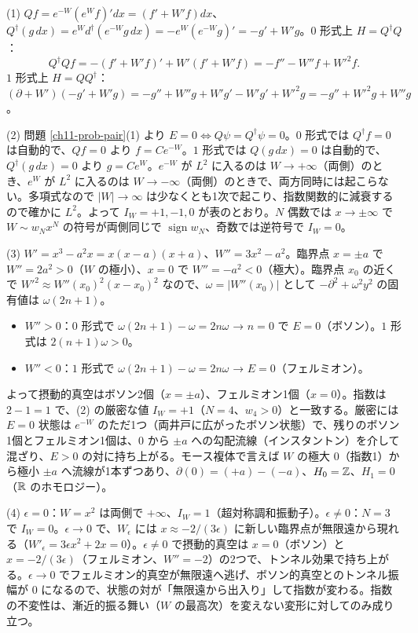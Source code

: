 \begin{solution}
(1) $Qf=e^{-W}(e^Wf)'dx=(f'+W'f)dx$、$Q^\dagger(g\,dx)=e^{W}d^\dagger(e^{-W}g\,dx)=-e^W(e^{-W}g)'=-g'+W'g$。$0$ 形式上 $H=Q^\dagger Q$：
\[
Q^\dagger Qf=-(f'+W'f)'+W'(f'+W'f)=-f''-W''f+W'^2f .
\]
$1$ 形式上 $H=QQ^\dagger$：$(\partial+W')(-g'+W'g)=-g''+W''g+W'g'-W'g'+W'^2g=-g''+W'^2g+W''g$。

(2) 問題 \ref{ch11-prob-pair}(1) より $E=0\iff Q\psi=Q^\dagger\psi=0$。$0$ 形式では $Q^\dagger f=0$ は自動的で、$Qf=0$ より $f=Ce^{-W}$。$1$ 形式では $Q(g\,dx)=0$ は自動的で、$Q^\dagger(g\,dx)=0$ より $g=Ce^{W}$。$e^{-W}$ が $L^2$ に入るのは $W\to+\infty$（両側）のとき、$e^W$ が $L^2$ に入るのは $W\to-\infty$（両側）のときで、両方同時には起こらない。多項式なので $\lvert W\rvert\to\infty$ は少なくとも1次で起こり、指数関数的に減衰するので確かに $L^2$。よって $I_W=+1,-1,0$ が表のとおり。$N$ 偶数では $x\to\pm\infty$ で $W\sim w_Nx^N$ の符号が両側同じで $\operatorname{sign}w_N$、奇数では逆符号で $I_W=0$。

(3) $W'=x^3-a^2x=x(x-a)(x+a)$、$W''=3x^2-a^2$。臨界点 $x=\pm a$ で $W''=2a^2>0$（$W$ の極小）、$x=0$ で $W''=-a^2<0$（極大）。臨界点 $x_0$ の近くで $W'^2\approx W''(x_0)^2(x-x_0)^2$ なので、$\omega=\lvert W''(x_0)\rvert$ として $-\partial^2+\omega^2y^2$ の固有値は $\omega(2n+1)$。
\begin{itemize}
\item $W''>0$：$0$ 形式で $\omega(2n+1)-\omega=2n\omega$ → $n=0$ で $E=0$（ボソン）。$1$ 形式は $2(n+1)\omega>0$。
\item $W''<0$：$1$ 形式で $\omega(2n+1)-\omega=2n\omega$ → $E=0$（フェルミオン）。
\end{itemize}
よって摂動的真空はボソン2個（$x=\pm a$）、フェルミオン1個（$x=0$）。指数は $2-1=1$ で、(2) の厳密な値 $I_W=+1$（$N=4$、$w_4>0$）と一致する。厳密には $E=0$ 状態は $e^{-W}$ のただ1つ（両井戸に広がったボソン状態）で、残りのボソン1個とフェルミオン1個は、$0$ から $\pm a$ への勾配流線（インスタントン）を介して混ざり、$E>0$ の対に持ち上がる。モース複体で言えば $W$ の極大 $0$（指数1）から極小 $\pm a$ へ流線が1本ずつあり、$\partial(0)=(+a)-(-a)$、$H_0=\mathbb{Z}$、$H_1=0$（$\mathbb{R}$ のホモロジー）。

(4) $\epsilon=0$：$W=x^2$ は両側で $+\infty$、$I_W=1$（超対称調和振動子）。$\epsilon\neq0$：$N=3$ で $I_W=0$。$\epsilon\to0$ で、$W_\epsilon$ には $x\approx-2/(3\epsilon)$ に新しい臨界点が無限遠から現れる（$W'_\epsilon=3\epsilon x^2+2x=0$）。$\epsilon\neq0$ で摂動的真空は $x=0$（ボソン）と $x=-2/(3\epsilon)$（フェルミオン、$W''=-2$）の2つで、トンネル効果で持ち上がる。$\epsilon\to0$ でフェルミオン的真空が無限遠へ逃げ、ボソン的真空とのトンネル振幅が $0$ になるので、状態の対が「無限遠から出入り」して指数が変わる。指数の不変性は、漸近的振る舞い（$W$ の最高次）を変えない変形に対してのみ成り立つ。
\end{solution}

